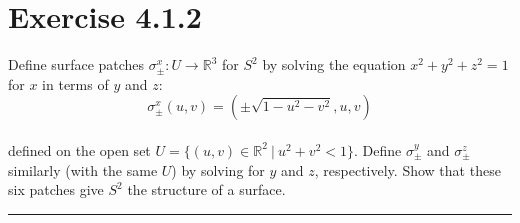 \documentclass[12pt]{article}
\begin{document}
\maketitle

\section*{Exercise 4.1.2}

Define surface patches $\sigma^{x}_{\pm}:U \rightarrow \mathbb{R}^3$ for $S^2$ by solving the equation $x^2 + y^2 + z^2 = 1$ for $x$ in terms of  $y$ and $z$:
$$
\sigma^{x}_{\pm}(u,v) = (\pm \sqrt{1-u^2-v^2}, u ,v)
$$
\\
defined on the open set $U = \lbrace (u,v) \in \mathbb{R}^2 \ \vert \ u^2 + v^2 < 1\rbrace$. Define $\sigma^{y}_{\pm}$ and $\sigma^{z}_{\pm}$ similarly (with the same $U$) by solving for $y$ and $z$, respectively. Show that these six patches give $S^2$ the structure of a surface.
\vspace{1cm}
\hrule
\vspace{1cm}
\end{document}
